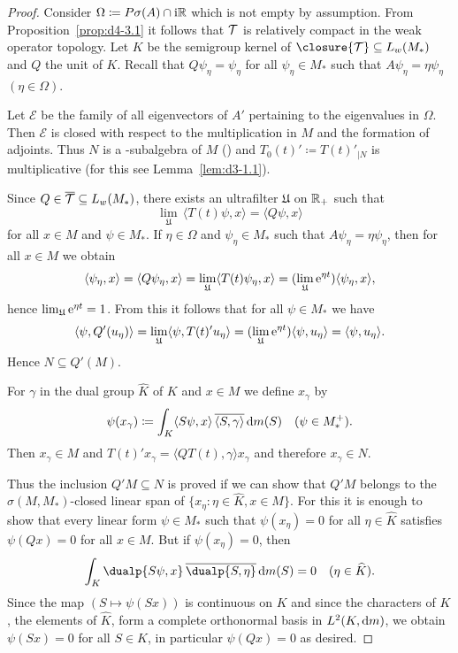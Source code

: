 \begin{proof}
Consider $\Omega \coloneqq P\sigma(A) \cap \mathrm{i}  \mathbb{R}$ which is not empty by assumption.
From Proposition~\ref{prop:d4-3.1} it follows that $\mathcal{T}$ is relatively compact in the weak operator topology.
Let $K$ be the semigroup kernel of\/ $\closure{\TT} \subseteq L_{w}(M_{*})$ and $Q$ the unit of\/ $K$.
Recall that $Q\psi_{\eta} = \psi_{\eta}$ for all $\psi_{\eta} \in M_{*}$ such that $A\psi_{\eta} = \eta\psi_{\eta}$ $(\eta \in \Omega)$.

Let $\mathcal{E}$ be the family of all eigenvectors of\/ $A'$ pertaining to the eigenvalues in $\Omega$.
Then $\mathcal{E}$ is closed with respect to the multiplication in $M$ and the formation of adjoints.
Thus $N$ is a \WA-subalgebra of\/ $M$ (\textcite[Corollary 1.7.9.]{sakai:1971}) and $T_{0}(t)' \coloneqq T(t)'_{|N}$ is multiplicative (for this see Lemma~\ref{lem:d3-1.1}).

Since $Q \in \overline{\mathcal{T}}  \subseteq L_{w}(M_{*})$, there exists an ultrafilter $\mathfrak{U}$ on $\mathbb{R}_{+}$ such that 
%
\[
	\lim_{\mathfrak{U}} \, \langle T(t)\psi,x\rangle = \langle Q\psi,x\rangle
\]
%
for all $x \in M$ and $\psi \in M_{*}$.
If\/ $\eta \in \Omega$ and $\psi_{\eta} \in M_{*}$ such that $A\psi_{\eta} = \eta\psi_{\eta}$, then for all $x \in M$ we obtain
\[
\langle \psi_{\eta} ,x \rangle = \langle Q\psi_{\eta},x \rangle = \lim_{\mathfrak{U}} \langle T(t)\psi_{\eta},x \rangle = 
(\lim_{\mathfrak{U}} \mathrm{e}^{\eta t}) \langle \psi_{\eta}, x \rangle,
\]
hence $\lim_{\mathfrak{U}} \mathrm{e}^{\eta t} = 1$.
From this it follows that for all $\psi \in M_{*}$ we have
\[
\langle\psi,Q'(u_{\eta})\rangle = \lim_{\mathfrak{U}} \langle\psi,T(t)'u_{\eta}\rangle 
= (\lim_{\mathfrak{U}} \mathrm{e}^{\eta t})\langle\psi,u_{\eta}\rangle 
 = \langle\psi,u_{\eta}\rangle.
\]
Hence $N \subseteq Q'(M)$.

For $\gamma$ in the dual group $\widehat{K}$ of\/ $K$ and $x \in M$ we define $x_{\gamma}$ by
\[
\psi(x_{\gamma}) \coloneqq \int_{K} 
	\langle S\psi ,x \rangle \, \overline{\langle S,\gamma \rangle}  \mathop{}\!\mathrm{d}{m}(S) \quad (\psi \in M_{*}^{+}).
\]
Then $x_{\gamma} \in M$ and $T(t)'x_{\gamma} = \langle QT(t),\gamma\rangle x_{\gamma}$ and therefore $x_{\gamma} \in N$.

Thus the inclusion $Q'M \subseteq N$ is proved if we can show that $Q'M$ belongs to the $\sigma(M,M_{*})$-closed linear span of\/ $\{x_{\eta} \colon \eta \in \widehat{K}, x \in M\}$.
For this it is enough to show that every linear form $\psi \in M_{*}$ such that $\psi(x_{\eta}) = 0$ for all $\eta \in \widehat{K}$ satisfies $\psi(Qx) = 0$ for all $x \in M$.
But if\/ $\psi(x_{\eta}) = 0$, then
\[
\int_{K} \dualp{S\psi,x} \, \overline{ \dualp{S,\eta} } \dm (S) = 0 \quad (\eta \in \widehat{K}) .
\]
Since the map $(S \mapsto \psi(Sx))$ is continuous on $K$ and since the characters of\/ $K$, \ie the elements of\/ $\widehat{K}$, form a complete orthonormal basis in $L^2(K,\mathop{}\!\mathrm{d}{m})$, we obtain $\psi(Sx) = 0$ for all $S \in K$, in particular $\psi(Qx) = 0$ as desired.


\end{proof}
